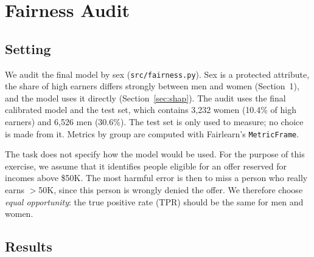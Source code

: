 \documentclass[10pt,a4paper]{article}
\newcommand{\high}{$>$50K}
\begin{document}
\section{Fairness Audit}
\label{sec:fairness}

\subsection{Setting}
We audit the final model by sex (\texttt{src/fairness.py}). Sex is a protected
attribute, the share of high earners differs strongly between men and women
(Section~1), and the model uses it directly (Section~\ref{sec:shap}). The audit uses the
final calibrated model and the test set, which contains 3,232 women (10.4\% of high
earners) and 6,526 men (30.6\%). The test set is only used to measure; no choice is made
from it. Metrics by group are computed with Fairlearn's \texttt{MetricFrame}.

The task does not specify how the model would be used. For the purpose of this
exercise, we assume that it identifies people eligible for an offer reserved for incomes
above \$50K. The most harmful error is then to miss a person who really earns
\high{}, since this person is wrongly denied the offer. We therefore choose 
\emph{equal opportunity}: the true positive rate (TPR) should be the same for men and women.

\subsection{Results}
\end{document}
